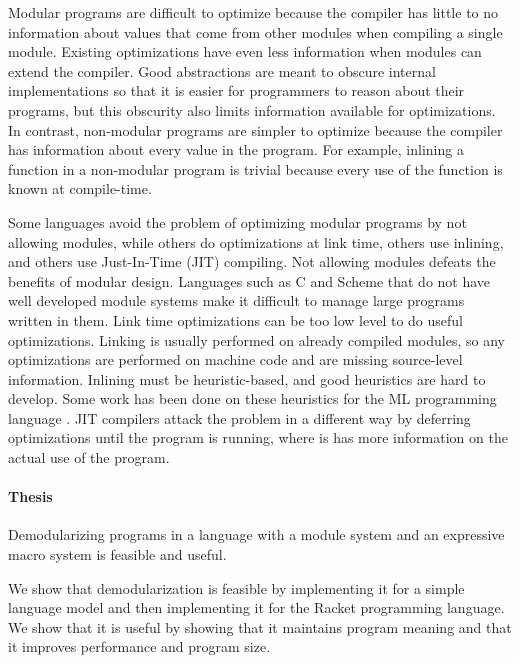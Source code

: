 Modular programs are difficult to optimize because the compiler has little to no information about values that come from other modules when compiling a single module.
Existing optimizations have even less information when modules can extend the compiler. 
Good abstractions are meant to obscure internal implementations so that it is easier for programmers to reason about their programs, but this obscurity also limits information available for optimizations.  
In contrast, non-modular programs are simpler to optimize because the compiler has information about every value in the program.
For example, inlining a function in a non-modular program is trivial because every use of the function is known at compile-time.

Some languages avoid the problem of optimizing modular programs by not allowing modules, while others do optimizations at link time, others use inlining, and others use Just-In-Time (JIT) compiling. 
Not allowing modules defeats the benefits of modular design. 
Languages such as C and Scheme that do not have well developed module systems make it difficult to manage large programs written in them.
Link time optimizations can be too low level to do useful optimizations.
Linking is usually performed on already compiled modules, so any optimizations are performed on machine code and are missing source-level information.
Inlining must be heuristic-based, and good heuristics are hard to develop. 
Some work has been done on these heuristics for the ML programming language \cite{258960}.
JIT compilers attack the problem in a different way by deferring optimizations until the program is running, where is has more information on the actual use of the program.


\paragraph{Thesis} Demodularizing programs in a language with a module system and an expressive macro system is feasible and useful.

We show that demodularization is feasible by implementing it for a simple language model and then implementing it for the Racket programming language.
We show that it is useful by showing that it maintains program meaning and that it improves performance and program size.


